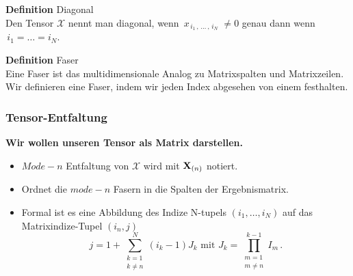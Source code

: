 \begin{frame}

\begin{framed}
\textbf{Definition} Diagonal \\
Den Tensor $\pmb{\mathcal{X}}$ nennt man diagonal, wenn
$\, x_{ \, i_1 \,, \, \dots \, , \, i_N \, } \, \neq 0$ genau dann wenn \\ $\, i_1 = \dots = i_N$.
\end{framed}

\pause

\begin{framed}
\textbf{Definition} Faser \\
Eine Faser ist das multidimensionale Analog zu Matrixspalten und Matrixzeilen. Wir definieren eine Faser, indem wir jeden Index abgesehen von einem festhalten.

\end{framed}

\end{frame}


\begin{frame}
\frametitle{Tensor-Entfaltung}
\textbf{Wir wollen unseren Tensor als Matrix darstellen.} \\
\pause
\begin{itemize}
\item $Mode-n$ Entfaltung von $\pmb{\mathcal{X}}$ wird mit $\bold{X}_{(n)}$ notiert.
\item Ordnet die $mode-n$ Fasern in die Spalten der Ergebnismatrix.
\item Formal ist es eine Abbildung des Indize N-tupels $(i_1,\dots,i_N)$ auf das Matrixindize-Tupel $(i_n,j) $
\begin{equation*}
j=1+\sum_{\substack{k=1 \\ k \neq n}}^{N} (i_k-1)J_k \text{ mit } J_k = \prod_{\substack{m=1 \\ m \neq n}}^{k-1} I_m \, .
\end{equation*}
\end{itemize}


\end{frame}


